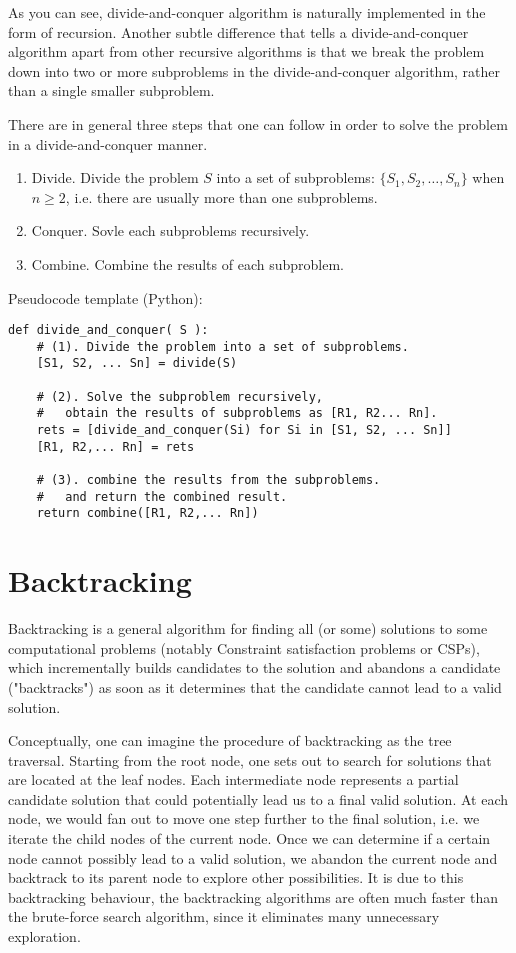 As you can see, divide-and-conquer algorithm is naturally implemented in the form of recursion.
Another subtle difference that tells a divide-and-conquer algorithm apart from other recursive algorithms is that we break the problem down into two or more subproblems in the divide-and-conquer algorithm, rather than a single smaller subproblem.


There are in general three steps that one can follow in order to solve the problem in a divide-and-conquer manner.
\begin{enumerate}
\item Divide. Divide the problem $S$ into a set of subproblems: $\{ S_1, S_2, \dots, S_n \}$ when $n \ge 2$, i.e. there are usually more than one subproblems.
\item Conquer. Sovle each subproblems recursively.
\item Combine. Combine the results of each subproblem.
\end{enumerate}

Pseudocode template (Python):
\begin{lstlisting}
def divide_and_conquer( S ):
    # (1). Divide the problem into a set of subproblems.
    [S1, S2, ... Sn] = divide(S)

    # (2). Solve the subproblem recursively,
    #   obtain the results of subproblems as [R1, R2... Rn].
    rets = [divide_and_conquer(Si) for Si in [S1, S2, ... Sn]]
    [R1, R2,... Rn] = rets

    # (3). combine the results from the subproblems.
    #   and return the combined result.
    return combine([R1, R2,... Rn])  
\end{lstlisting}



\section{Backtracking}

Backtracking is a general algorithm for finding all (or some) solutions to some computational problems (notably Constraint satisfaction problems or CSPs), which incrementally builds candidates to the solution and abandons a candidate ("backtracks") as soon as it determines that the candidate cannot lead to a valid solution.

Conceptually, one can imagine the procedure of backtracking as the tree traversal.
Starting from the root node, one sets out to search for solutions that are located at the leaf nodes.
Each intermediate node represents a partial candidate solution that could potentially lead us to a final valid solution.
At each node, we would fan out to move one step further to the final solution, i.e. we iterate the child nodes of the current node.
Once we can determine if a certain node cannot possibly lead to a valid solution, we abandon the current node and backtrack to its parent node to explore other possibilities.
It is due to this backtracking behaviour, the backtracking algorithms are often much faster than the brute-force search algorithm, since it eliminates many unnecessary exploration.


